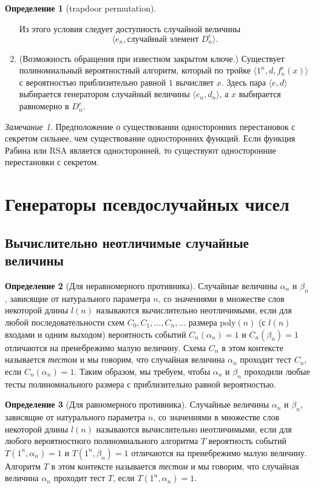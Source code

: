 \documentclass[12pt]{article}
\newcommand{\poly}{\mathrm{poly}}
\theoremstyle{definition}
\newtheorem{definition}{Определение}[section]
\theoremstyle{plain}
\theoremstyle{remark}
\newtheorem{remark}{Замечание}[section]
\begin{document}
\begin{definition}[trapdoor permutation]
\begin{enumerate}
Из этого условия следует доступность случайной величины
$$\langle e_n, \text{случайный элемент $D_n^e$} \rangle.$$

\item (Возможность обращения при известном закрытом ключе.)
Существует полиномиальный вероятностный алгоритм, который
по тройке $\langle 1^n, d, f_n^e(x) \rangle$ с вероятностью
приблизительно равной $1$ вычисляет $x$. Здесь пара
$\langle e,d \rangle$ выбирается генератором случайный
величины $\langle e_n,d_n \rangle$, а $x$ выбирается
равномерно в $D_n^e$.
\end{enumerate}
\end{definition}
\begin{remark}
Предположение о существовании односторонних перестановок
с секретом сильнее, чем существование односторонних
функций. Если функция Рабина или RSA является односторонней,
то существуют односторонние перестановки с секретом.
\end{remark}

\section{Генераторы псевдослучайных чисел}
\subsection{Вычислительно неотличимые случайные величины}
\begin{definition}[Для неравномерного противника]
Случайные величины $\alpha_n$ и $\beta_n$, зависящие
от натурального параметра $n$, со значениями в множестве
слов некоторой длины $l(n)$ называются вычислительно
неотличимыми, если для любой последовательности схем
$C_0,C_1,\dotsc, C_n,\dotsc$ размера $\poly(n)$
(с $l(n)$ входами и одним выходом) вероятность событий
$C_n(\alpha_n) = 1$ и $C_n(\beta_n) = 1$ отличаются на 
пренебрежимо малую величину. Схема $C_n$ в этом контексте
называется \emph{тестом} и мы говорим, что случайная величина
$\alpha_n$ проходит тест $C_n$, если $C_n(\alpha_n)= 1$.
Таким образом, мы требуем, чтобы $\alpha_n$ и $\beta_n$
проходили любые тесты полиномиального размера с приблизительно
равной вероятностью.
\end{definition}

\begin{definition}[Для равномерного противника]
Случайные величины $\alpha_n$ и $\beta_n$, зависящие
от натурального параметра $n$, со значениями в множестве
слов некоторой длины $l(n)$ называются вычислительно
неотличимыми, если для любого вероятностного 
полиномиального алгоритма $T$ вероятность событий
$T(1^n, \alpha_n) = 1$ и $T(1^n, \beta_n) = 1$ отличаются на 
пренебрежимо малую величину. Алгоритм $T$ в этом контексте
называется \emph{тестом} и мы говорим, что случайная величина
$\alpha_n$ проходит тест $T$, если $T(1^n, \alpha_n)= 1$.
\end{definition}
\end{document}
